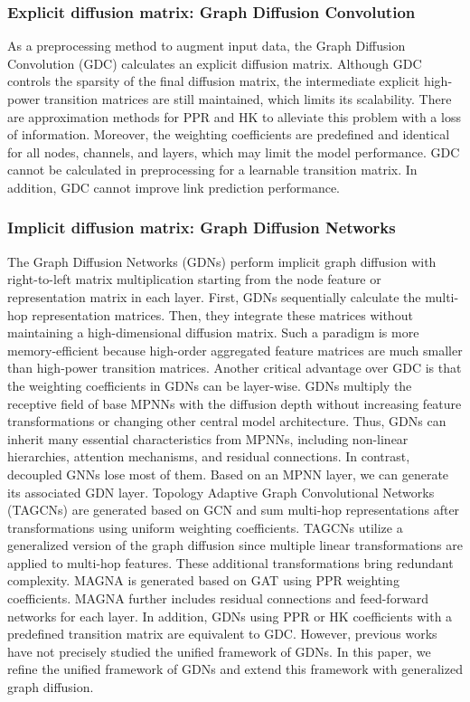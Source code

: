\documentclass{article}
\begin{document}
\subsubsection{Explicit diffusion matrix: Graph Diffusion Convolution}
As a preprocessing method to augment input data, the Graph Diffusion Convolution (GDC) \cite{klicpera2019diffusion} calculates an explicit diffusion matrix. Although GDC controls the sparsity of the final diffusion matrix, the intermediate explicit high-power transition matrices are still maintained, which limits its scalability. There are approximation methods for PPR and HK to alleviate this problem with a loss of information. Moreover, the weighting coefficients are predefined and identical for all nodes, channels, and layers, which may limit the model performance. GDC cannot be calculated in preprocessing for a learnable transition matrix. In addition, GDC cannot improve link prediction performance.

\subsubsection{Implicit diffusion matrix: Graph Diffusion Networks}
The Graph Diffusion Networks (GDNs) perform implicit graph diffusion with right-to-left matrix multiplication starting from the node feature or representation matrix in each layer. First, GDNs sequentially calculate the multi-hop representation matrices. Then, they integrate these matrices without maintaining a high-dimensional diffusion matrix. Such a paradigm is more memory-efficient because high-order aggregated feature matrices are much smaller than high-power transition matrices. Another critical advantage over GDC is that the weighting coefficients in GDNs can be layer-wise. GDNs multiply the receptive field of base MPNNs with the diffusion depth without increasing feature transformations or changing other central model architecture. 
Thus, GDNs can inherit many essential characteristics from MPNNs, including non-linear hierarchies, attention mechanisms, and residual connections. In contrast, decoupled GNNs lose most of them. Based on an MPNN layer, we can generate its associated GDN layer. Topology Adaptive Graph Convolutional Networks (TAGCNs) \cite{du2017topology} are generated based on GCN and sum multi-hop representations after transformations using uniform weighting coefficients. TAGCNs utilize a generalized version of the graph diffusion since multiple linear transformations are applied to multi-hop features. These additional transformations bring redundant complexity. MAGNA \cite{wang2020direct} is generated based on GAT using PPR weighting coefficients. MAGNA further includes residual connections and feed-forward networks for each layer. In addition, GDNs using PPR or HK coefficients with a predefined transition matrix are equivalent to GDC.
However, previous works have not precisely studied the unified framework of GDNs. In this paper, we refine the unified framework of GDNs and extend this framework with generalized graph diffusion.  
\end{document}
